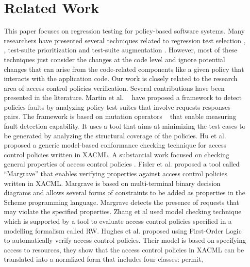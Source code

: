 \section{Related Work}
\label{sec:related}
This paper focuses on regression testing for policy-based software systems. 
Many researchers have presented several techniques related to regression test selection \cite{Rothermel:1996:ART:235681.235682}, 
\cite{Graves:2001:ESR:367008.367020}, test-suite prioritization \cite{Elbaum:2000:PTC:347324.348910} and test-suite augmentation \cite{santelices08sep}. 
However, most of these techniques just consider the changes at the code level and ignore potential changes that can arise from the code-related components like a given policy that interacts with the application code. 
Our work is closely related to the research area of access control policies verification. Several contributions have been 
presented in the literature. Martin et al. ~\cite{martin06:defining} have proposed a framework to detect policies faults by analyzing
 policy test suites that involve 
requests-responses pairs. The framework is based on mutation operators ~\cite{martin07:fault} that enable measuring fault detection capability. 
It uses a tool \cite {martin07:automated} that aims at minimizing the test cases to be generated by analyzing the structural coverage of the policies.
Hu et al. ~\cite{hu07:conformance} proposed a generic model-based conformance checking technique for access control policies written in
XACML.
A substantial work focused on checking general properties of access control policies 
\cite{Fisler:2005:VCA:1062455.1062502,Lupu99conflictsin,Jajodia:1997:LLE:882493.884380,Bonatti:2000:MAC:352600.352623}. 
Fisler et al. \cite{Fisler:2005:VCA:1062455.1062502} proposed a tool called ``Margrave'' that enables verifying properties against 
access control policies written in XACML. Margrave is based on multi-terminal binary decision diagrams and allows several forms of 
constraints to be added as properties in the Scheme programming language. Margrave detects the presence of requests that may violate the specified properties.
Zhang et al \cite{DBLP:conf/isw/ZhangRG05} used model checking technique which is supported by a tool to evaluate access
control policies specified in a modelling formalism called RW. Hughes et al. \cite{hughes04:automated} proposed using First-Order Logic 
to automatically verify access control policies. Their model is based on specifying access to resources, they show that the access
control policies in XACML can be translated into a normlized form that includes four classes: permit,

